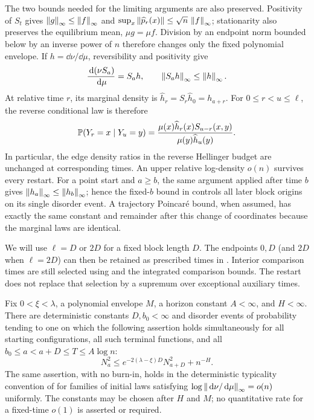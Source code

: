 The two bounds needed for the limiting arguments are also preserved.
Positivity of $S_t$ gives $\norm g_\infty\le\norm f_\infty$ and
$\sup_x\norm{\widehat p_r(x)}\le\sqrt n\,\norm f_\infty$;
stationarity also preserves the equilibrium mean, $\mu g=\mu f$.
Division by an endpoint norm bounded below by an inverse power of $n$
therefore changes only the fixed polynomial envelope.  If
$h=\dd\nu/\dd\mu$, reversibility and positivity give
\begin{equation}\label{eq:cutoff-restart-density}
 \frac{\dd(\nu S_a)}{\dd\mu}=S_a h,
 \qquad \norm{S_a h}_\infty\le\norm h_\infty.
\end{equation}
At relative time $r$, its marginal density is
$\widehat h_r=S_r\widehat h_0=h_{a+r}$.  For $0\le r<u\le\ell$,
the reverse conditional law is therefore
\[
 \P(Y_r=x\mid Y_u=y)
 =\frac{\mu(x)\widehat h_r(x)S_{u-r}(x,y)}
        {\mu(y)\widehat h_u(y)}.
\]
In particular, the edge density ratios in the reverse Hellinger
budget are unchanged at corresponding times.  An upper relative
log-density $o(n)$ survives every restart.  For a point start and $a\ge b$, the same argument applied
after time $b$ gives
$\norm{h_a}_\infty\le\norm{h_b}_\infty$; hence the fixed-$b$
bound in  controls all later block origins
on its single disorder event.  A trajectory Poincar\'e bound, when
assumed, has exactly the same constant and remainder after this
change of coordinates because the marginal laws are identical.

We will use $\ell=D$ or $2D$ for a fixed block length $D$.
The endpoints $0,D$ (and $2D$ when $\ell=2D$) can then be retained as prescribed times in
.  Interior comparison times are still
selected using  and the integrated
comparison bounds.  The restart does not replace that selection by a
supremum over exceptional auxiliary times.

\begin{proposition}
\label{prop:cutoff-block}
Fix $0<\xi<\lambda$, a polynomial envelope $M$, a horizon constant
$A<\infty$, and $H<\infty$.  There are deterministic constants
$D,b_0<\infty$ and disorder events of probability tending to one on
which the following assertion holds simultaneously for all starting
configurations, all such terminal functions, and all
$b_0\le a<a+D\le T\le A\log n$:
\begin{equation}
 N_a^2\le e^{-2(\lambda-\xi)D}N_{a+D}^2+n^{-H}.
 \label{eq:cutoff-block}
\end{equation}
The same assertion, with no burn-in, holds in the deterministic
typicality convention of  for families of
initial laws satisfying
$\log\norm{\dd\nu/\dd\mu}_\infty=o(n)$ uniformly.
The constants may be chosen after $H$ and $M$; no quantitative rate
for a fixed-time $o(1)$ is asserted or required.
\end{proposition}

